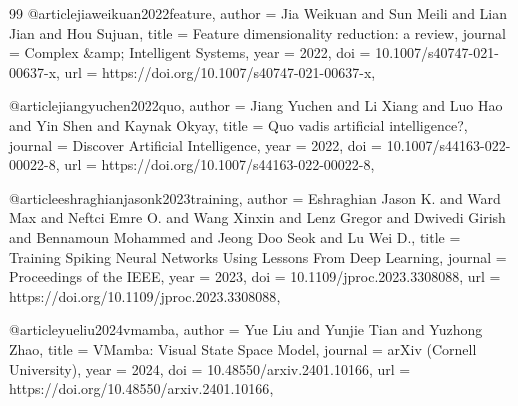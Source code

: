 \documentclass[12pt]{article}
\begin{document}
\begin{thebibliography}{99}
@article{jiaweikuan2022feature,
  author = {Jia Weikuan and Sun Meili and Lian Jian and Hou Sujuan},
  title = {{Feature dimensionality reduction: a review}},
  journal = {Complex &amp; Intelligent Systems},
  year = {2022},
  doi = {10.1007/s40747-021-00637-x},
  url = {https://doi.org/10.1007/s40747-021-00637-x},
}

@article{jiangyuchen2022quo,
  author = {Jiang Yuchen and Li Xiang and Luo Hao and Yin Shen and Kaynak Okyay},
  title = {{Quo vadis artificial intelligence?}},
  journal = {Discover Artificial Intelligence},
  year = {2022},
  doi = {10.1007/s44163-022-00022-8},
  url = {https://doi.org/10.1007/s44163-022-00022-8},
}

@article{eshraghianjasonk2023training,
  author = {Eshraghian Jason K. and Ward Max and Neftci Emre O. and Wang Xinxin and Lenz Gregor and Dwivedi Girish and Bennamoun Mohammed and Jeong Doo Seok and Lu Wei D.},
  title = {{Training Spiking Neural Networks Using Lessons From Deep Learning}},
  journal = {Proceedings of the IEEE},
  year = {2023},
  doi = {10.1109/jproc.2023.3308088},
  url = {https://doi.org/10.1109/jproc.2023.3308088},
}

@article{yueliu2024vmamba,
  author = {Yue Liu and Yunjie Tian and Yuzhong Zhao},
  title = {{VMamba: Visual State Space Model}},
  journal = {arXiv (Cornell University)},
  year = {2024},
  doi = {10.48550/arxiv.2401.10166},
  url = {https://doi.org/10.48550/arxiv.2401.10166},
}
\end{thebibliography}
\end{document}
